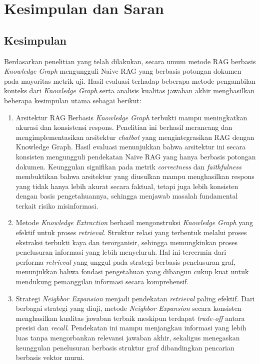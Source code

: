 \chapter{Kesimpulan dan Saran}
\section{Kesimpulan}
Berdasarkan penelitian yang telah dilakukan, secara umum metode RAG berbasis \textit{Knowledge Graph} mengungguli Naive RAG yang berbasis potongan dokumen pada mayoritas metrik uji.
Hasil evaluasi terhadap beberapa metode pengambilan konteks dari \textit{Knowledge Graph} serta analisis kualitas jawaban akhir menghasilkan beberapa kesimpulan utama sebagai berikut:

\begin{enumerate}
      \item Arsitektur RAG Berbasis \textit{Knowledge Graph} terbukti mampu meningkatkan akurasi dan konsistensi respons.
            Penelitian ini berhasil merancang dan mengimplementasikan arsitektur \textit{chatbot} yang mengintegrasikan RAG dengan Knowledge Graph.
            Hasil evaluasi menunjukkan bahwa arsitektur ini secara konsisten mengungguli pendekatan Naive RAG yang hanya berbasis potongan dokumen.
            Keunggulan signifikan pada metrik \textit{correctness} dan \textit{faithfulness} membuktikan bahwa arsitektur yang diusulkan mampu menghasilkan respons yang tidak hanya lebih akurat secara faktual, tetapi juga lebih konsisten dengan basis pengetahuannya, sehingga menjawab masalah fundamental terkait risiko misinformasi.

      \item Metode \textit{Knowledge Extraction} berhasil mengonstruksi \textit{Knowledge Graph} yang efektif untuk proses \textit{retrieval}.
            Struktur relasi yang terbentuk melalui proses ekstraksi terbukti kaya dan terorganisir, sehingga memungkinkan proses penelusuran informasi yang lebih menyeluruh.
            Hal ini tercermin dari performa \textit{retrieval} yang unggul pada strategi berbasis penelusuran graf, menunjukkan bahwa fondasi pengetahuan yang dibangun cukup kuat untuk mendukung pemanggilan informasi secara komprehensif.

      \item Strategi \textit{Neighbor Expansion} menjadi pendekatan \textit{retrieval} paling efektif.
            Dari berbagai strategi yang diuji, metode \textit{Neighbor Expansion} secara konsisten menghasilkan kualitas jawaban terbaik meskipun terdapat \textit{trade-off} antara presisi dan \textit{recall}.
            Pendekatan ini mampu menjangkau informasi yang lebih luas tanpa mengorbankan relevansi jawaban akhir, sekaligus menegaskan keunggulan penelusuran berbasis struktur graf dibandingkan pencarian berbasis vektor murni.
\end{enumerate}

